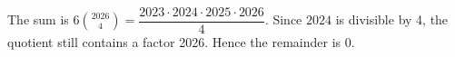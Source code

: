 The sum is $6\binom{2026}{4}=\dfrac{2023\cdot2024\cdot2025\cdot2026}{4}$. Since $2024$ is divisible by 4, the quotient still contains a factor 2026. Hence the remainder is $\boxed0$.
